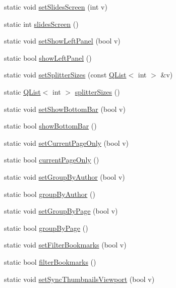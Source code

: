 \begin{DoxyCompactItemize}
static void \hyperlink{classOkular_1_1Settings_a12575582901d218e5fe5d731f25bdbb9}{set\+Slides\+Screen} (int v)
\item 
static int \hyperlink{classOkular_1_1Settings_a8c3effff997dea37e71f645dada4a2a8}{slides\+Screen} ()
\item 
static void \hyperlink{classOkular_1_1Settings_aaa5a7f85e39b14fe3d37b881b094cae6}{set\+Show\+Left\+Panel} (bool v)
\item 
static bool \hyperlink{classOkular_1_1Settings_a7952adac91d195914f9fce8114800789}{show\+Left\+Panel} ()
\item 
static void \hyperlink{classOkular_1_1Settings_a200f93dca896025f00097bd625a567f2}{set\+Splitter\+Sizes} (const \hyperlink{classQList}{Q\+List}$<$ int $>$ \&v)
\item 
static \hyperlink{classQList}{Q\+List}$<$ int $>$ \hyperlink{classOkular_1_1Settings_a1de19e4396dc92ba19264cf8baced20f}{splitter\+Sizes} ()
\item 
static void \hyperlink{classOkular_1_1Settings_a21798225ed117c60a87bf9cf475fb1d9}{set\+Show\+Bottom\+Bar} (bool v)
\item 
static bool \hyperlink{classOkular_1_1Settings_ac44b50c193993a61ec7c70b7e9414617}{show\+Bottom\+Bar} ()
\item 
static void \hyperlink{classOkular_1_1Settings_ac9ab89a6af874f114266c90f119b30cf}{set\+Current\+Page\+Only} (bool v)
\item 
static bool \hyperlink{classOkular_1_1Settings_a73ac0013d8755f5b601064516b201406}{current\+Page\+Only} ()
\item 
static void \hyperlink{classOkular_1_1Settings_a1a69aa99d573edbc31213fffc2375c21}{set\+Group\+By\+Author} (bool v)
\item 
static bool \hyperlink{classOkular_1_1Settings_a6da9b5ed7cd5aad9091b9218b2f1f85e}{group\+By\+Author} ()
\item 
static void \hyperlink{classOkular_1_1Settings_a756e711e2155309446a285ae5787e45f}{set\+Group\+By\+Page} (bool v)
\item 
static bool \hyperlink{classOkular_1_1Settings_ada3fd3c60d72a0876746831fd3fe2b0a}{group\+By\+Page} ()
\item 
static void \hyperlink{classOkular_1_1Settings_a4d3c63568c7e923f25cdae52da568900}{set\+Filter\+Bookmarks} (bool v)
\item 
static bool \hyperlink{classOkular_1_1Settings_ac76b4ff74c6e07ef55d076c6eaa0a030}{filter\+Bookmarks} ()
\item 
static void \hyperlink{classOkular_1_1Settings_a6b0c843914041844b47321ea29f71703}{set\+Sync\+Thumbnails\+Viewport} (bool v)

\end{DoxyCompactItemize}
